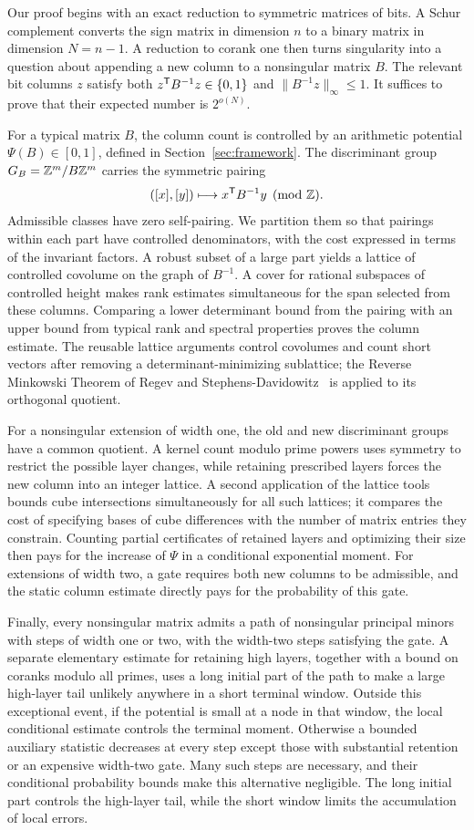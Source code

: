 Our proof begins with an exact reduction to symmetric matrices of
bits. A Schur complement converts the sign matrix in dimension \(n\)
to a binary matrix in dimension \(N=n-1\). A reduction to corank one
then turns singularity into a question about appending a new column to
a nonsingular matrix \(B\). The relevant bit columns \(z\) satisfy
both \(z^{\mathsf T}B^{-1}z\in\{0,1\}\) and
\(\|B^{-1}z\|_\infty\le1\). It suffices to prove that their expected
number is \(2^{o(N)}\).

For a typical matrix \(B\), the column count is controlled by an
arithmetic potential \(\Psi(B)\in[0,1]\), defined in
Section~\ref{sec:framework}. The discriminant group
\(G_B=\mathbb Z^m/B\mathbb Z^m\) carries the symmetric pairing
\[
 ([x],[y])\longmapsto x^{\mathsf T}B^{-1}y\pmod{\mathbb Z}.
\]
Admissible classes have zero self-pairing. We partition them so that
pairings within each part have controlled denominators, with the cost
expressed in terms of the invariant factors. A robust subset of a large
part yields a lattice of controlled covolume on the graph of \(B^{-1}\).
A cover for rational subspaces of controlled height makes rank estimates
simultaneous for the span selected from these columns. Comparing a lower
determinant bound from the pairing with an upper bound from typical rank
and spectral properties proves the column estimate. The reusable lattice
arguments control covolumes and count short vectors after removing a
determinant-minimizing sublattice; the Reverse Minkowski Theorem of Regev
and Stephens-Davidowitz~\cite{ReverseMinkowski} is applied to its
orthogonal quotient.

For a nonsingular extension of width one, the old and new discriminant
groups have a common quotient. A kernel count modulo prime powers uses
symmetry to restrict the possible layer changes, while retaining
prescribed layers forces the new column into an integer lattice. A
second application of the lattice tools bounds cube intersections
simultaneously for all such lattices; it compares the cost of specifying
bases of cube differences with the number of matrix entries they
constrain. Counting partial certificates of retained layers and
optimizing their size then pays for the increase of \(\Psi\) in a
conditional exponential moment. For extensions of width two, a gate
requires both new columns to be admissible, and the static column
estimate directly pays for the probability of this gate.

Finally, every nonsingular matrix admits a path of nonsingular principal
minors with steps of width one or two, with the width-two steps satisfying
the gate. A separate elementary estimate for retaining high layers,
together with a bound on coranks modulo all primes, uses a long initial
part of the path to make a large high-layer tail unlikely anywhere in
a short terminal window. Outside this exceptional event, if the potential
is small at a node in that
window, the local conditional estimate controls the terminal moment.
Otherwise a bounded auxiliary statistic decreases at every step except
those with substantial retention or an expensive width-two gate. Many
such steps are necessary, and their conditional probability bounds make
this alternative negligible. The long initial part controls the
high-layer tail, while the short window limits the accumulation of local
errors.
